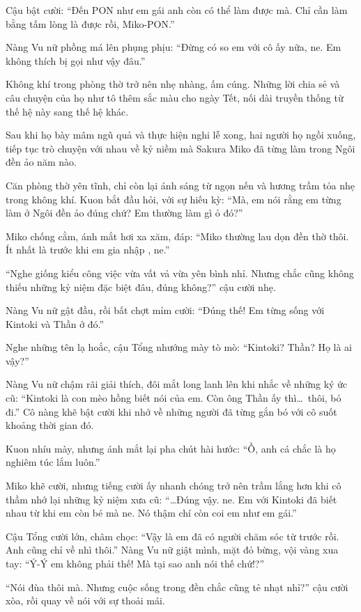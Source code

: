\documentclass[../main.tex]{subfiles}
\begin{document}
Cậu bật cười: ``Đến PON như em gái anh còn có thể làm được mà. Chỉ cần làm bằng tấm lòng là được rồi, Miko-PON.''

Nàng Vu nữ phồng má lên phụng phịu: ``Đừng có so em với cô ấy nữa, ne. Em không thích bị gọi như vậy đâu.''

Không khí trong phòng thờ trở nên nhẹ nhàng, ấm cúng. Những lời chia sẻ và câu chuyện của họ như tô thêm sắc màu cho ngày Tết, nối dài truyền thống từ thế hệ này sang thế hệ khác.

Sau khi họ bày mâm ngũ quả và thực hiện nghi lễ xong, hai người họ ngồi xuống, tiếp tục trò chuyện với nhau về kỷ niềm mà Sakura Miko đã từng làm trong Ngôi đền ảo năm nào.

Căn phòng thờ yên tĩnh, chỉ còn lại ánh sáng từ ngọn nến và hương trầm tỏa nhẹ trong không khí. Kuon bắt đầu hỏi, với sự hiếu kỳ: ``Mà, em nói rằng em từng làm ở Ngôi đền ảo đúng chứ? Em thường làm gì ỏ đó?''

Miko chống cằm, ánh mắt hơi xa xăm, đáp: ``Miko thường lau dọn đền thờ thôi. Ít nhất là trước khi em gia nhập \hll, ne.''

``Nghe giống kiểu công việc vừa vất vả vừa yên bình nhỉ. Nhưng chắc cũng không thiếu những kỷ niệm đặc biệt đâu, đúng không?'' cậu cười nhẹ.

Nàng Vu nữ gật đầu, rồi bất chợt mỉm cười: ``Đúng thế! Em từng sống với Kintoki và Thần ở đó.''

Nghe những tên lạ hoắc, cậu Tổng nhướng mày tò mò: ``Kintoki? Thần? Họ là ai vậy?''

Nàng Vu nữ chậm rãi giải thích, đôi mắt long lanh lên khi nhắc về những ký ức cũ: ``Kintoki là con mèo hồng biết nói của em. Còn ông Thần ấy thì\dots\ thôi, bỏ đi.'' Cô nàng khẽ bật cười khi nhớ về những người đã từng gắn bó với cô suốt khoảng thời gian đó.

Kuon nhíu mày, nhưng ánh mắt lại pha chút hài hước: ``Ồ, anh cá chắc là họ nghiêm túc lắm luôn.''

Miko khẽ cười, nhưng tiếng cười ấy nhanh chóng trở nên trầm lắng hơn khi cô thầm nhớ lại những kỷ niệm xưa cũ: ``\dots Đúng vậy. ne. Em với Kintoki đã biết nhau từ khi em còn bé mà ne. Nó thậm chí còn coi em như em gái.''

Cậu Tổng cười lớn, châm chọc: ``Vậy là em đã có người chăm sóc từ trước rồi. Anh cũng chỉ về nhì thôi.'' Nàng Vu nữ giật mình, mặt đỏ bừng, vội vàng xua tay: ``Ý-Ý em không phải thế! Mà tại sao anh nói thế chứ!?''

``Nói đùa thôi mà. Nhưng cuộc sống trong đền chắc cũng tẻ nhạt nhỉ?'' cậu cười xòa, rồi quay về nói với sự thoải mái.
\end{document}
